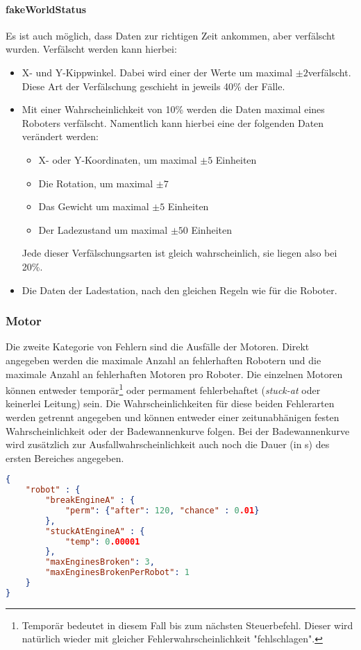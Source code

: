 \paragraph{fakeWorldStatus} Es ist auch m{\"{o}}glich, dass Daten zur richtigen Zeit ankommen, aber
    verf{\"{a}}lscht wurden. Verf{\"{a}}lscht werden kann hierbei:
	\begin{itemize}
		\item X- und Y-Kippwinkel. Dabei wird einer der Werte um maximal $\pm 2$\textdegree verf{\"{a}}lscht.
			Diese Art der Verf{\"{a}}lschung geschieht in jeweils 40\% der F{\"{a}}lle.
		\item Mit einer Wahrscheinlichkeit von 10\% werden die Daten maximal eines Roboters verf{\"{a}}lscht.
			Namentlich kann hierbei eine der folgenden Daten ver{\"{a}}ndert werden:
			\begin{itemize}
				\item X- oder Y-Koordinaten, um maximal $\pm 5$ Einheiten
				\item Die Rotation, um maximal $\pm 7$\textdegree
				\item Das Gewicht um maximal $\pm 5$ Einheiten
				\item Der Ladezustand um maximal $\pm 50$ Einheiten
			\end{itemize}
			Jede dieser Verf{\"{a}}lschungsarten ist gleich wahrscheinlich, sie liegen also bei 20\%.
		\item Die Daten der Ladestation, nach den gleichen Regeln wie f{\"{u}}r die Roboter.
	\end{itemize}

\subsubsection{Motor}
Die zweite Kategorie von Fehlern sind die Ausf{\"{a}}lle der Motoren. Direkt angegeben werden die maximale
Anzahl an fehlerhaften Robotern und die maximale Anzahl an fehlerhaften Motoren pro Roboter.
Die einzelnen Motoren k{\"{o}}nnen entweder tempor{\"{a}}r\footnote{Tempor{\"{a}}r bedeutet
in diesem Fall bis zum n{\"{a}}chsten Steuerbefehl. Dieser wird nat{\"{u}}rlich wieder mit
gleicher Fehlerwahrscheinlichkeit "fehlschlagen".} oder permament fehlerbehaftet (\textit{stuck-at}
oder keinerlei Leitung) sein. Die Wahrscheinlichkeiten f{\"{u}}r diese beiden Fehlerarten werden getrennt
angegeben und k{\"{o}}nnen entweder einer zeitunabh{\"{a}}nigen festen Wahrscheinlichkeit oder der
Badewannenkurve folgen. Bei der Badewannenkurve wird zus{\"{a}}tzlich zur Ausfallwahrscheinlichkeit auch
noch die Dauer (in s) des ersten Bereiches angegeben.
\begin{lstlisting}[frame=single, language=json] 
{
	"robot" : {
		"breakEngineA" : {
			"perm": {"after": 120, "chance" : 0.01}
		},
		"stuckAtEngineA" : {
			"temp": 0.00001
		},
		"maxEnginesBroken": 3,
		"maxEnginesBrokenPerRobot": 1
	}
}
\end{lstlisting}


